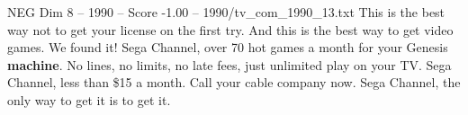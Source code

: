 \begin{textsample}{NEG Dim 8 – 1990 – Score -1.00 – 1990/tv\_com\_1990\_13.txt}  \label{ex:f8_neg_027}
This is the best way not to get your license on the first try.
And this is the best way to get video games.
We found it!
Sega Channel, over 70 hot games a month for your Genesis \textbf{machine}.
No lines, no limits, no late fees, just unlimited play on your TV.
Sega Channel, less than \$15 a month.
Call your cable company now.
Sega Channel, the only way to get it is to get it.

\end{textsample}
